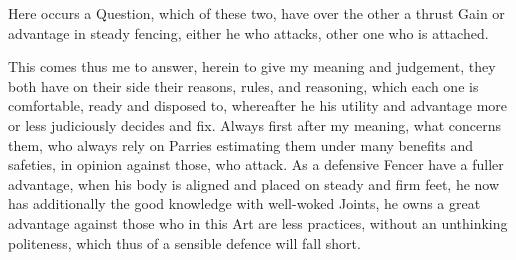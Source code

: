 \newpage


\newpage


Here occurs a Question, which of these two, have over the other a
thrust Gain or advantage in steady fencing, either he who attacks,
other one who is attached.

This comes thus me to answer, herein to give my meaning and judgement,
they both have on their side their reasons, rules, and reasoning,
which each one is comfortable, ready and disposed to, whereafter he
his utility and advantage more or less judiciously decides and
fix. Always first after my meaning, what concerns them, who always
rely on Parries estimating them under many benefits and safeties, in
opinion against those, who attack.
As a defensive Fencer have a fuller advantage, when his body is
aligned and placed on steady and firm feet, he now has additionally
the good knowledge with well-woked Joints, he owns a great advantage
against those who in this Art are less practices, without an
unthinking politeness, which thus of a
sensible defence will fall short.
